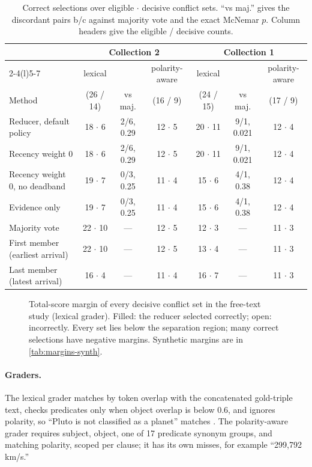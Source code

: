 \begin{table}[t]
  \centering
  \caption{Correct selections over eligible $\cdot$ decisive conflict sets. ``vs maj.'' gives the discordant pairs b/c against majority vote and the exact McNemar $p$. Column headers give the eligible / decisive counts.}
  \label{tab:freetext}
  \footnotesize
  \setlength{\tabcolsep}{3.5pt}
  \begin{tabular}{@{}lcccccc@{}}
    \toprule
    & \multicolumn{3}{c}{Collection 2} & \multicolumn{3}{c}{Collection 1} \\
    \cmidrule(lr){2-4}\cmidrule(l){5-7}
    & lexical & & polarity-aware & lexical & & polarity-aware \\
    Method & (26 / 14) & vs maj. & (16 / 9) & (24 / 15) & vs maj. & (17 / 9) \\
    \midrule
    Reducer, default policy & 18 $\cdot$ 6 & 2/6, 0.29 & 12 $\cdot$ 5 & 20 $\cdot$ 11 & 9/1, 0.021 & 12 $\cdot$ 4 \\
    Recency weight 0 & 18 $\cdot$ 6 & 2/6, 0.29 & 12 $\cdot$ 5 & 20 $\cdot$ 11 & 9/1, 0.021 & 12 $\cdot$ 4 \\
    Recency weight 0, no deadband & 19 $\cdot$ 7 & 0/3, 0.25 & 11 $\cdot$ 4 & 15 $\cdot$ 6 & 4/1, 0.38 & 12 $\cdot$ 4 \\
    Evidence only & 19 $\cdot$ 7 & 0/3, 0.25 & 11 $\cdot$ 4 & 15 $\cdot$ 6 & 4/1, 0.38 & 12 $\cdot$ 4 \\
    Majority vote & 22 $\cdot$ 10 & --- & 12 $\cdot$ 5 & 12 $\cdot$ 3 & --- & 11 $\cdot$ 3 \\
    First member (earliest arrival) & 22 $\cdot$ 10 & --- & 12 $\cdot$ 5 & 13 $\cdot$ 4 & --- & 11 $\cdot$ 3 \\
    Last member (latest arrival) & 16 $\cdot$ 4 & --- & 11 $\cdot$ 4 & 16 $\cdot$ 7 & --- & 11 $\cdot$ 3 \\
    \bottomrule
  \end{tabular}
\end{table}

\begin{figure}[t]
  \centering
  
  \caption{Total-score margin of every decisive conflict set in the free-text study (lexical grader). Filled: the reducer selected correctly; open: incorrectly. Every set lies below the separation region; many correct selections have negative margins. Synthetic margins are in \cref{tab:margins-synth}.}
  \label{fig:margins}
\end{figure}

\paragraph{Graders.} The lexical grader matches by token overlap with the concatenated gold-triple text, checks predicates only when object overlap is below 0.6, and ignores polarity, so ``Pluto is not classified as a planet'' matches . The polarity-aware grader requires subject, object, one of 17 predicate synonym groups, and matching polarity, scoped per clause; it has its own misses, for example ``299,792 km/s.''

